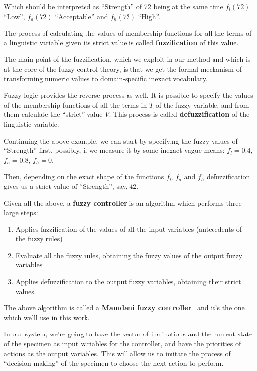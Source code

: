 \documentclass[12pt, a4paper]{report}
\begin{document}
  Which should be interpreted as ``Strength'' of 72 being at the same time $f_l(72)$ ``Low'', $f_a(72)$ ``Acceptable'' and $f_h(72)$ ``High''.

  The process of calculating the values of membership functions for all the terms of a linguistic variable given its strict value is called \textbf{fuzzification} of this value.

  The main point of the fuzzification, which we exploit in our method and which is at the core of the fuzzy control theory, is that we get the formal mechanism of transforming numeric values to domain-specific inexact vocabulary.

  Fuzzy logic provides the reverse process as well.
  It is possible to specify the values of the membership functions of all the terms in $T$ of the fuzzy variable, and from them calculate the ``strict'' value $V$.
  This process is called \textbf{defuzzification} of the linguistic variable.

  Continuing the above example, we can start by specifying the fuzzy values of ``Strength'' first, possibly, if we measure it by some inexact vague means:
  $f_l = 0.4$, $f_a = 0.8$, $f_h = 0$.

  Then, depending on the exact shape of the functions $f_l$, $f_a$ and $f_h$ defuzzification gives us a strict value of ``Strength'', say, $42$.

  Given all the above, a \textbf{fuzzy controller} is an algorithm which performs three large steps:

  \begin{enumerate}
    \item Applies fuzzification of the values of all the input variables (antecedents of the fuzzy rules)
    \item Evaluate all the fuzzy rules, obtaining the fuzzy values of the output fuzzy variables
    \item Applies defuzzification to the output fuzzy variables, obtaining their strict values.
  \end{enumerate}

  The above algorithm is called a \textbf{Mamdani fuzzy controller}~\cite{fuzzy::Mamdani} and it's the one which we'll use in this work.

  In our system, we're going to have the vector of inclinations and the current state of the specimen as input variables for the controller,
  and have the priorities of actions as the output variables.
  This will allow us to imitate the process of ``decision making'' of the specimen to choose the next action to perform.
\end{document}
